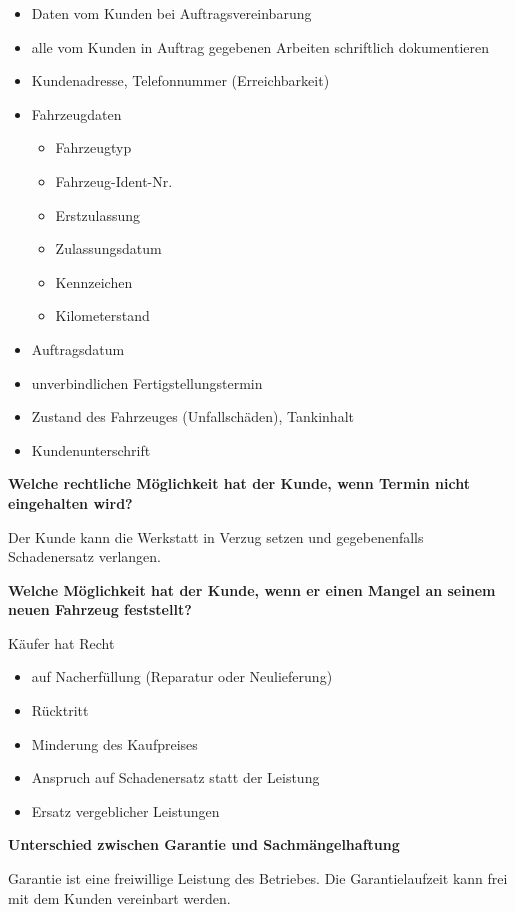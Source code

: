 \begin{itemize}
\item
  Daten vom Kunden bei Auftragsvereinbarung
\item
  alle vom Kunden in Auftrag gegebenen Arbeiten schriftlich
  dokumentieren
\item
  Kundenadresse, Telefonnummer (Erreichbarkeit)
\item
  Fahrzeugdaten

  \begin{itemize}
  \item
    Fahrzeugtyp
  \item
    Fahrzeug-Ident-Nr.
  \item
    Erstzulassung
  \item
    Zulassungsdatum
  \item
    Kennzeichen
  \item
    Kilometerstand
  \end{itemize}
\item
  Auftragsdatum
\item
  unverbindlichen Fertigstellungstermin
\item
  Zustand des Fahrzeuges (Unfallschäden), Tankinhalt
\item
  Kundenunterschrift
\end{itemize}

\textbf{Welche rechtliche Möglichkeit hat der Kunde, wenn Termin nicht
eingehalten wird?}

Der Kunde kann die Werkstatt in Verzug setzen und gegebenenfalls
Schadenersatz verlangen.

\textbf{Welche Möglichkeit hat der Kunde, wenn er einen Mangel an seinem
neuen Fahrzeug feststellt?}

Käufer hat Recht

\begin{itemize}
\item
  auf Nacherfüllung (Reparatur oder Neulieferung)
\item
  Rücktritt
\item
  Minderung des Kaufpreises
\item
  Anspruch auf Schadenersatz statt der Leistung
\item
  Ersatz vergeblicher Leistungen
\end{itemize}

\textbf{Unterschied zwischen Garantie und Sachmängelhaftung}

Garantie ist eine freiwillige Leistung des Betriebes. Die
Garantielaufzeit kann frei mit dem Kunden vereinbart werden.

